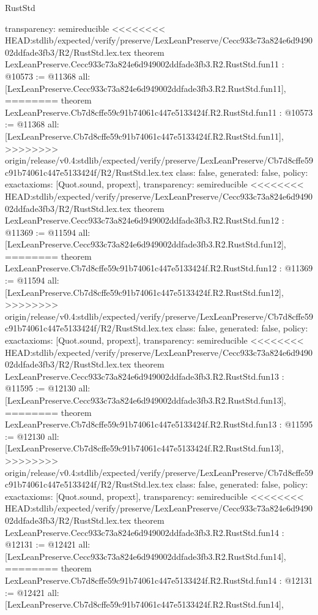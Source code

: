 \begin{lexlean}{RustStd}
\begin{coremodule}
{\begin{coremodule}
{{{{{{{{{{{{{{  transparency: semireducible
}
<<<<<<<< HEAD:stdlib/expected/verify/preserve/LexLeanPreserve/Cecc933c73a824e6d949002ddfade3fb3/R2/RustStd.lex.tex
theorem LexLeanPreserve.Cecc933c73a824e6d949002ddfade3fb3.R2.RustStd.fun11 : @10573 := @11368 {
  all: [LexLeanPreserve.Cecc933c73a824e6d949002ddfade3fb3.R2.RustStd.fun11],
========
theorem LexLeanPreserve.Cb7d8cffe59c91b74061c447e5133424f.R2.RustStd.fun11 : @10573 := @11368 {
  all: [LexLeanPreserve.Cb7d8cffe59c91b74061c447e5133424f.R2.RustStd.fun11],
>>>>>>>> origin/release/v0.4:stdlib/expected/verify/preserve/LexLeanPreserve/Cb7d8cffe59c91b74061c447e5133424f/R2/RustStd.lex.tex
  class: false,
  generated: false,
  policy: exact{axioms: [Quot.sound, propext]},
  transparency: semireducible
}
<<<<<<<< HEAD:stdlib/expected/verify/preserve/LexLeanPreserve/Cecc933c73a824e6d949002ddfade3fb3/R2/RustStd.lex.tex
theorem LexLeanPreserve.Cecc933c73a824e6d949002ddfade3fb3.R2.RustStd.fun12 : @11369 := @11594 {
  all: [LexLeanPreserve.Cecc933c73a824e6d949002ddfade3fb3.R2.RustStd.fun12],
========
theorem LexLeanPreserve.Cb7d8cffe59c91b74061c447e5133424f.R2.RustStd.fun12 : @11369 := @11594 {
  all: [LexLeanPreserve.Cb7d8cffe59c91b74061c447e5133424f.R2.RustStd.fun12],
>>>>>>>> origin/release/v0.4:stdlib/expected/verify/preserve/LexLeanPreserve/Cb7d8cffe59c91b74061c447e5133424f/R2/RustStd.lex.tex
  class: false,
  generated: false,
  policy: exact{axioms: [Quot.sound, propext]},
  transparency: semireducible
}
<<<<<<<< HEAD:stdlib/expected/verify/preserve/LexLeanPreserve/Cecc933c73a824e6d949002ddfade3fb3/R2/RustStd.lex.tex
theorem LexLeanPreserve.Cecc933c73a824e6d949002ddfade3fb3.R2.RustStd.fun13 : @11595 := @12130 {
  all: [LexLeanPreserve.Cecc933c73a824e6d949002ddfade3fb3.R2.RustStd.fun13],
========
theorem LexLeanPreserve.Cb7d8cffe59c91b74061c447e5133424f.R2.RustStd.fun13 : @11595 := @12130 {
  all: [LexLeanPreserve.Cb7d8cffe59c91b74061c447e5133424f.R2.RustStd.fun13],
>>>>>>>> origin/release/v0.4:stdlib/expected/verify/preserve/LexLeanPreserve/Cb7d8cffe59c91b74061c447e5133424f/R2/RustStd.lex.tex
  class: false,
  generated: false,
  policy: exact{axioms: [Quot.sound, propext]},
  transparency: semireducible
}
<<<<<<<< HEAD:stdlib/expected/verify/preserve/LexLeanPreserve/Cecc933c73a824e6d949002ddfade3fb3/R2/RustStd.lex.tex
theorem LexLeanPreserve.Cecc933c73a824e6d949002ddfade3fb3.R2.RustStd.fun14 : @12131 := @12421 {
  all: [LexLeanPreserve.Cecc933c73a824e6d949002ddfade3fb3.R2.RustStd.fun14],
========
theorem LexLeanPreserve.Cb7d8cffe59c91b74061c447e5133424f.R2.RustStd.fun14 : @12131 := @12421 {
  all: [LexLeanPreserve.Cb7d8cffe59c91b74061c447e5133424f.R2.RustStd.fun14],
}}}}}}}}}}}}}}}}}}
\end{coremodule}}
\end{coremodule}
\end{lexlean}
